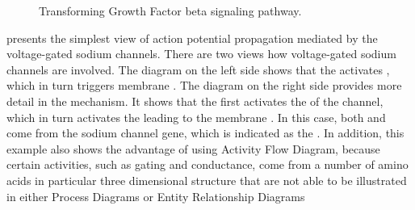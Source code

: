 \begin{figure}
\begin{center}
\caption{Transforming Growth Factor beta signaling pathway.}\label{fig:TGFbeta}
\end{center}
\end{figure}

 presents the simplest view of action potential propagation mediated by the voltage-gated sodium channels.  There are two views how voltage-gated sodium channels are involved.  The diagram on the left side shows that the  activates , which in turn triggers membrane .  The diagram on the right side provides more detail in the mechanism.  It shows that the  first activates the  of the channel, which in turn activates the  leading to the membrane .  In this case, both  and  come from the sodium channel gene, which is indicated as the .  In addition, this example also shows the advantage of using Activity Flow Diagram, because certain activities, such as gating and conductance, come from a number of amino acids in particular three dimensional structure that are not able to be illustrated in either Process Diagrams or Entity Relationship Diagrams



